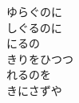 \documentclass[10pt,b5j]{tarticle} %
\begin{document}
\begin{enumerate}
\begin{minipage}[c]{\blocksize}
        \vspace{\linespace}
        \item
        ゆらぐのに\\
        しぐるのに\\
        にるの\\
        きりをひつつ\\
        れるのを\\
        きにさずや
    
    \end{minipage}
\end{enumerate} %
\end{document}
